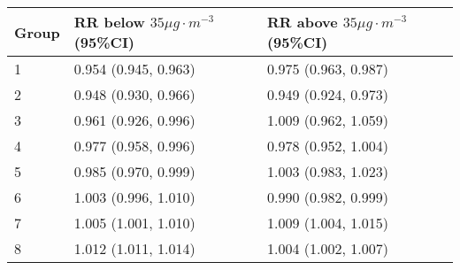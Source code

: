 \begin{tabular}{lll}
  \hline
Group & RR below $35 \mu g \cdot m^{-3}$ (95\%CI) & RR above $35 \mu g \cdot m^{-3}$ (95\%CI) \\ 
  \hline
   1 & 0.954 (0.945, 0.963) & 0.975 (0.963, 0.987) \\ 
     2 & 0.948 (0.930, 0.966) & 0.949 (0.924, 0.973) \\ 
     3 & 0.961 (0.926, 0.996) & 1.009 (0.962, 1.059) \\ 
     4 & 0.977 (0.958, 0.996) & 0.978 (0.952, 1.004) \\ 
     5 & 0.985 (0.970, 0.999) & 1.003 (0.983, 1.023) \\ 
     6 & 1.003 (0.996, 1.010) & 0.990 (0.982, 0.999) \\ 
     7 & 1.005 (1.001, 1.010) & 1.009 (1.004, 1.015) \\ 
     8 & 1.012 (1.011, 1.014) & 1.004 (1.002, 1.007) \\ 
   \hline
\end{tabular}

